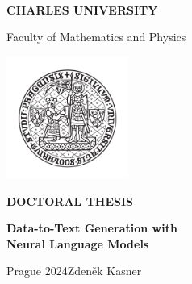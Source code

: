 \documentclass[12pt,notitlepage,a4paper,openright]{report}
\begin{document}
\renewcommand{\thepage}{\roman{page}}
\begin{titlepage}
    \begin{center}
        \ \\
        \vspace{10mm}
        {\Large\bf \uppercase{Charles University}}


        {\Large Faculty of Mathematics and Physics}
        \vspace{5mm}

        \includegraphics[height=40mm]{logo-uk.pdf}

        \vspace{25mm}

        {\Huge\bf \uppercase{Doctoral Thesis}}

        \vspace{10mm}


        {\LARGE\bf Data-to-Text Generation with\\Neural Language Models}\\
    \end{center}
    \vspace{50mm}

    {\Large Prague 2024}\hfill{\Large Zdeněk Kasner}
\end{titlepage}

\pagestyle{plain}
\normalsize
\end{document}
